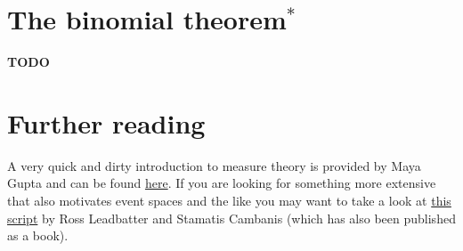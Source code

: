 \documentclass[a4paper,11pt,leqno]{report}
\begin{document}
\section{The binomial theorem$^{*}$}
\textbf{TODO}


\section*{Further reading}
A very quick and dirty introduction to measure theory is provided by Maya Gupta and can be found 
\href{https://www.ee.washington.edu/techsite/papers/documents/UWEETR-2006-0008.pdf}{here}. If you are
looking for something more extensive that also motivates event spaces and the like you may want to 
take a look at \href{http://www.stat.ncsu.edu/people/fuentes/courses/st778/lectures/ross}{this script}
by Ross Leadbatter and Stamatis Cambanis (which has also been published as a book).
\end{document}
